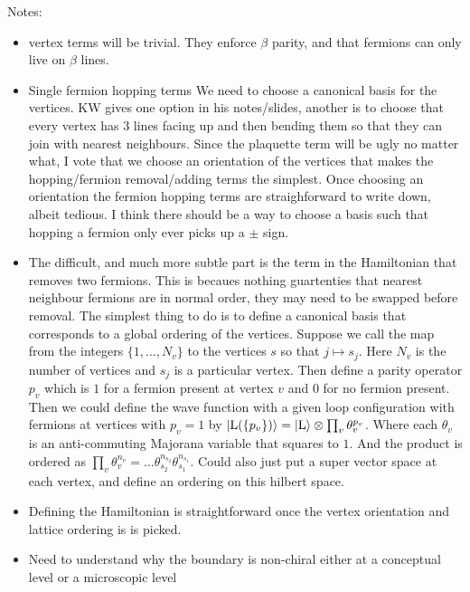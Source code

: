 \documentclass[12pt,a4paper]{article}
\newcommand{\ket}[1]{\ensuremath{\left|#1\right\rangle}}
\begin{document}
Notes:
\begin{itemize}
\item vertex terms will be trivial. They enforce $\beta$ parity, and that fermions can only live on $\beta$ lines. 
\item Single fermion hopping terms
We need to choose a canonical basis for the vertices. KW gives one option in his notes/slides, another is to choose that every vertex has 3 lines facing up and then bending them so that they can join with nearest neighbours. Since the plaquette term will be ugly no matter what, I vote that we choose an orientation of the vertices that makes the hopping/fermion removal/adding terms the simplest. 
Once choosing an orientation the fermion hopping terms are straighforward to write down, albeit tedious. 
I think there should be a way to choose a basis such that hopping a fermion only ever picks up a $\pm$ sign. 
\item The difficult, and much more subtle part is the term in the Hamiltonian that removes two fermions. This is becaues nothing guartenties that nearest neighbour fermions are in normal order, they may need to be swapped before removal. 
The simplest thing to do is to define a canonical basis that corresponds to a global ordering of the vertices.
Suppose we call the map from the integers $\{ 1, \hdots, N_v \}$ to the vertices $s$ so that $j \mapsto s_j$. Here $N_v$ is the number of vertices and $s_j$ is a particular vertex. 
Then define a parity operator $p_v$ which is $1$ for a fermion present at vertex $v$ and $0$ for no fermion present. Then we could define the wave function with a given loop configuration { } with fermions at vertices with $p_v =1$ by $\ket{\text{\cal L}(\{p_v \}) } = \ket{\text{\cal L}} \otimes \prod_v \theta_v^{p_v}$. 
Where each $\theta_v$ is an anti-commuting Majorana variable that squares to $1$. And the product is ordered as $\prod_v \theta_v^{n_v} =\hdots \theta_{s_2}^{n_{s_2}} \theta_{s_1}^{n_{s_1}}$.
Could also just put a super vector space at each vertex, and define an ordering on this hilbert space. 
\item Defining the Hamiltonian is straightforward once the vertex orientation and lattice ordering is is picked.  
\item Need to understand why the boundary is non-chiral either at a conceptual level or a microscopic level
\end{itemize}
\end{document}

